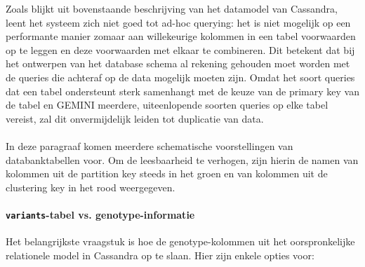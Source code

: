 Zoals blijkt uit bovenstaande beschrijving van het datamodel van Cassandra, leent het systeem zich niet goed tot ad-hoc querying: het is niet mogelijk op een performante manier zomaar aan willekeurige kolommen in een tabel voorwaarden op te leggen en deze voorwaarden met elkaar te combineren. Dit betekent dat bij het ontwerpen van het database schema al rekening gehouden moet worden met de queries die achteraf op de data mogelijk moeten zijn. Omdat het soort queries dat een tabel ondersteunt sterk samenhangt met de keuze van de primary key van de tabel en GEMINI meerdere, uiteenlopende soorten queries op elke tabel vereist, zal dit onvermijdelijk leiden tot duplicatie van data.\\\\
In deze paragraaf komen meerdere schematische voorstellingen van databanktabellen voor. Om de leesbaarheid te verhogen, zijn hierin de namen van kolommen uit de partition key steeds in het {\color{green} groen} en van kolommen uit de clustering key in het {\color{red} rood} weergegeven.

\paragraph{\texttt{variants}-tabel vs. genotype-informatie}

Het belangrijkste vraagstuk is hoe de genotype-kolommen uit het oorspronkelijke relationele model in Cassandra op te slaan. Hier zijn enkele opties voor:

